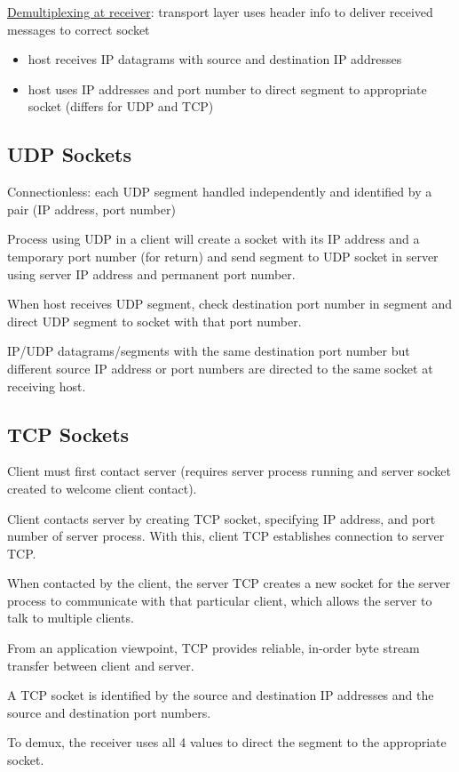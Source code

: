 \documentclass[11pt]{article}
\begin{document}
\uline{Demultiplexing at receiver}: transport layer uses header info to deliver
received messages to correct socket
\begin{itemize}
\item host receives IP datagrams with source and destination IP addresses
\item host uses IP addresses and port number to direct segment to appropriate
socket (differs for UDP and TCP)
\end{itemize}
\subsection{UDP Sockets}
\label{sec:orgefe9823}
Connectionless: each UDP segment handled independently and identified by
a pair (IP address, port number)

Process using UDP in a client will create a socket with its IP address
and a temporary port number (for return) and send segment to UDP socket
in server using server IP address and permanent port number.

When host receives UDP segment, check destination port number in
segment and direct UDP segment to socket with that port number.

IP/UDP datagrams/segments with the same destination port number but
different source IP address or port numbers are directed to the
same socket at receiving host.
\subsection{TCP Sockets}
\label{sec:org93f7efc}
Client must first contact server (requires server process running and server
socket created to welcome client contact).

Client contacts server by creating TCP socket, specifying IP address, and port
number of server process.
With this, client TCP establishes connection to server TCP.

When contacted by the client, the server TCP creates a new socket for the
server process to communicate with that particular client, which allows the server
to talk to multiple clients.

From an application viewpoint, TCP provides reliable, in-order byte stream
transfer between client and server.

A TCP socket is identified by the source and destination IP addresses and the
source and destination port numbers.

To demux, the receiver uses all 4 values to direct the segment to the appropriate
socket.
\end{document}
